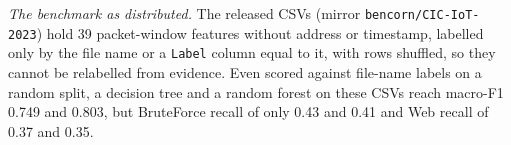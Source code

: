 \emph{The benchmark as distributed.} The released CSVs (mirror \texttt{bencorn/CIC-IoT-2023}) hold 39 packet-window features without address or timestamp, labelled only by the file name or a \texttt{Label} column equal to it, with rows shuffled, so they cannot be relabelled from evidence. Even scored against file-name labels on a random split, a decision tree and a random forest on these CSVs reach macro-F1 0.749 and 0.803, but BruteForce recall of only 0.43 and 0.41 and Web recall of 0.37 and 0.35.
